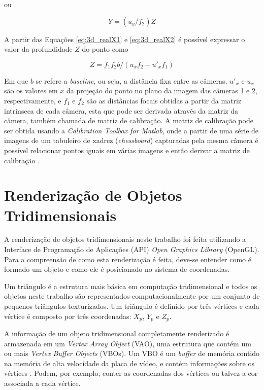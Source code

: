 {ou

\begin{equation}
Y = (u_y/f_2) Z
\label{eq:3d_realY2}
\end{equation}  


A partir das Equações \ref{eq:3d_realX1} e \ref{eq:3d_realX2} é possível
expressar o valor da profundidade $Z$ do ponto como

\begin{equation}
Z = f_1  f_2  b / (u_x  f_2 - u'_x  f_1)
\label{eq:3d_Zequation}
\end{equation}


Em que $b$ se refere a \textit{baseline}, ou seja, a distância fixa entre as
câmeras, $u'_x$ e $u_x$ são os valores em $x$ da projeção do ponto no plano da
imagem das câmeras 1 e 2, respectivamente, e $f_1$ e $f_2$ são as distâncias
focais obtidas a partir da matriz intrínseca de cada câmera, esta que pode ser
derivada através da matriz da câmera, também chamada de matriz de calibração. A
matriz de calibração pode ser obtida usando a \textit{Calibration Toolbox for
Matlab}, onde a partir de uma série de imagens de um tabuleiro de xadrez
(\textit{chessboard}) capturadas pela mesma câmera é possível relacionar pontos
iguais em várias imagens e então derivar a matriz de calibração
\cite{bouguetML}.

\section{Renderização de Objetos Tridimensionais}

A renderização de objetos tridimensionais neste trabalho foi feita utilizando a
 Interface de
Programação de Aplicações (API)  \textit{Open Graphics Library} (OpenGL). Para a compreensão de como
esta renderização é feita, deve-se entender como é formado um objeto e como ele
é posicionado no sistema de coordenadas. 

Um triângulo é a estrutura mais básica em computação tridimensional
\cite{openGlWikibooks} e todos os objetos neste trabalho são representados
computacionalmente por um conjunto de pequenos triângulos texturizados. Um
triângulo é definido por três vértices e cada vértice é composto por três
coordenadas: $X_p$, $Y_p$ e $Z_p$.

A informação de um objeto tridimensional completamente renderizado é armazenada
em um  \textit{Vertex Array
Object} (VAO), uma estrutura que contém um ou mais
 \textit{Vertex Buffer Objects}
(VBOs). Um VBO é um \textit{buffer} de memória contido na memória de alta
velocidade da placa de vídeo, e contém informações sobre os vértices
\cite{openGlOrg}. Podem, por exemplo, conter as coordenadas dos vértices ou
talvez a cor associada a cada vértice.

}
